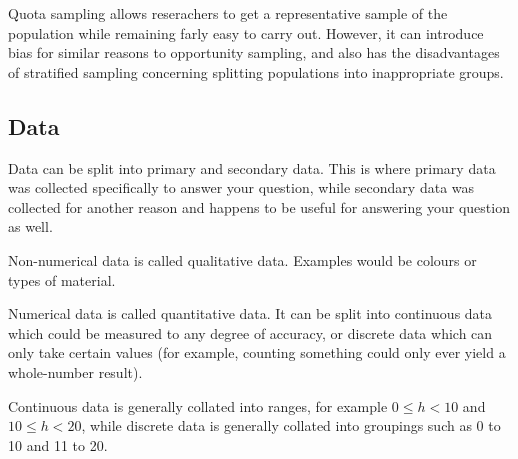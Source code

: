 Quota sampling allows reserachers to get a representative sample of the population while remaining farly easy to carry out. However, it can introduce bias for similar reasons to opportunity sampling, and also has the disadvantages of stratified sampling concerning splitting populations into inappropriate groups.

\subsection{Data}
Data can be split into primary and secondary data. This is where primary data was collected specifically to answer your question, while secondary data was collected for another reason and happens to be useful for answering your question as well.

Non-numerical data is called qualitative data. Examples would be colours or types of material.

Numerical data is called quantitative data. It can be split into continuous data which could be measured to any degree of accuracy, or discrete data which can only take certain values (for example, counting something could only ever yield a whole-number result).

Continuous data is generally collated into ranges, for example $0 \leq h < 10$ and $10 \leq h < 20$, while discrete data is generally collated into groupings such as 0 to 10 and 11 to 20.
